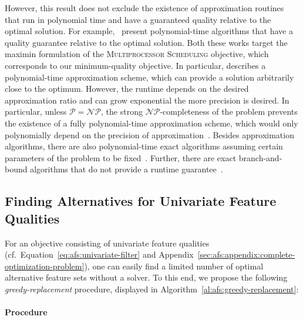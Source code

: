 \documentclass{article}
\theoremstyle{definition}
\begin{document}
However, this result does not exclude the existence of approximation routines that run in polynomial time and have a guaranteed quality relative to the optimal solution.
For example, \cite{deuermeyer1982scheduling, woeginger1997polynomial}~present polynomial-time algorithms that have a quality guarantee relative to the optimal solution.
Both these works target the maximin formulation of the \textsc{Multiprocessor Scheduling} objective, which corresponds to our minimum-quality objective.
In particular, \cite{woeginger1997polynomial} describes a polynomial-time approximation scheme, which can provide a solution arbitrarily close to the optimum.
However, the runtime depends on the desired approximation ratio and can grow exponential the more precision is desired.
In particular, unless $\mathcal{P}=\mathcal{NP}$, the strong $\mathcal{NP}$-completeness of the problem prevents the existence of a fully polynomial-time approximation scheme, which would only polynomially depend on the precision of approximation~\cite{woeginger1997polynomial}.
Besides approximation algorithms, there are also polynomial-time exact algorithms assuming certain parameters of the problem to be fixed~\cite{mnich2018parameterized}.
Further, there are exact branch-and-bound algorithms that do not provide a runtime guarantee~\cite{haouari2008maximizing, walter2017improved}.

\subsection{Finding Alternatives for Univariate Feature Qualities}
\label{sec:afs:appendix:univariate-search-algorithm}

For an objective consisting of univariate feature qualities (cf.~Equation~\ref{eq:afs:univariate-filter} and Appendix~\ref{sec:afs:appendix:complete-optimization-problem}), one can easily find a limited number of optimal alternative feature sets without a solver.
To this end, we propose the following \emph{greedy-replacement} procedure, displayed in Algorithm~\ref{al:afs:greedy-replacement}:

\paragraph{Procedure}
\end{document}
